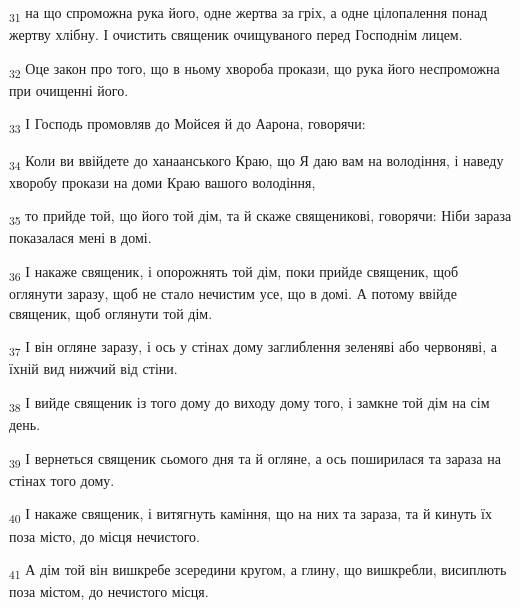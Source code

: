 \begin{tcolorbox}
\textsubscript{31} на що спроможна рука його, одне жертва за гріх, а одне цілопалення понад жертву хлібну. І очистить священик очищуваного перед Господнім лицем.
\end{tcolorbox}
\begin{tcolorbox}
\textsubscript{32} Оце закон про того, що в ньому хвороба прокази, що рука його неспроможна при очищенні його.
\end{tcolorbox}
\begin{tcolorbox}
\textsubscript{33} І Господь промовляв до Мойсея й до Аарона, говорячи:
\end{tcolorbox}
\begin{tcolorbox}
\textsubscript{34} Коли ви ввійдете до ханаанського Краю, що Я даю вам на володіння, і наведу хворобу прокази на доми Краю вашого володіння,
\end{tcolorbox}
\begin{tcolorbox}
\textsubscript{35} то прийде той, що його той дім, та й скаже священикові, говорячи: Ніби зараза показалася мені в домі.
\end{tcolorbox}
\begin{tcolorbox}
\textsubscript{36} І накаже священик, і опорожнять той дім, поки прийде священик, щоб оглянути заразу, щоб не стало нечистим усе, що в домі. А потому ввійде священик, щоб оглянути той дім.
\end{tcolorbox}
\begin{tcolorbox}
\textsubscript{37} І він огляне заразу, і ось у стінах дому заглиблення зеленяві або червоняві, а їхній вид нижчий від стіни.
\end{tcolorbox}
\begin{tcolorbox}
\textsubscript{38} І вийде священик із того дому до виходу дому того, і замкне той дім на сім день.
\end{tcolorbox}
\begin{tcolorbox}
\textsubscript{39} І вернеться священик сьомого дня та й огляне, а ось поширилася та зараза на стінах того дому.
\end{tcolorbox}
\begin{tcolorbox}
\textsubscript{40} І накаже священик, і витягнуть каміння, що на них та зараза, та й кинуть їх поза місто, до місця нечистого.
\end{tcolorbox}
\begin{tcolorbox}
\textsubscript{41} А дім той він вишкребе зсередини кругом, а глину, що вишкребли, висиплють поза містом, до нечистого місця.
\end{tcolorbox}
